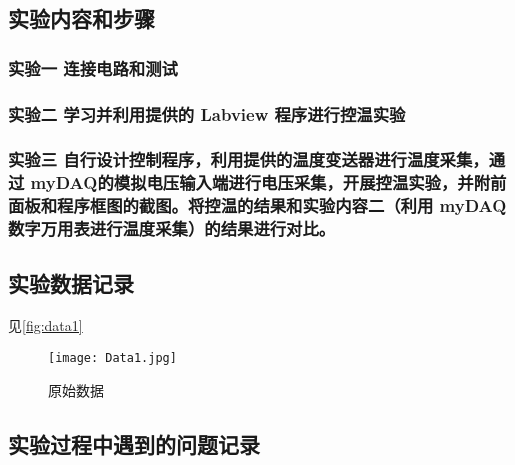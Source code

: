 \documentclass[dvipsnames, svgnames,a4paper,11pt]{article}
\begin{document}
\subsection{实验内容和步骤}

	\subsubsection{实验一 \quad 连接电路和测试}
	



	\subsubsection{实验二 \quad 学习并利用提供的 Labview 程序进行控温实验}





	\subsubsection{实验三 \quad 自行设计控制程序，利用提供的温度变送器进行温度采集，通过 myDAQ的模拟电压输入端进行电压采集，开展控温实验，并附前面板和程序框图的截图。将控温的结果和实验内容二（利用 myDAQ 数字万用表进行温度采集）的结果进行对比。}




\subsection{实验数据记录}

    见\cref{fig:data1}

    \begin{figure}[htbp]
        \centering
        {\texttt{[image: Data1.jpg]}\label{fig:data1}}
        \quad

        \caption{原始数据}
        \label{fig:data}
    \end{figure}






\subsection{实验过程中遇到的问题记录}
\end{document}
